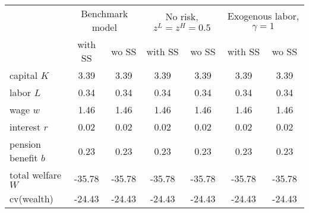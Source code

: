 
\begin{table}\centering
\begin{tabular}{lcccccc}
\toprule
	& \multicolumn{2}{c}{Benchmark model} & \multicolumn{2}{c}{No risk, $z^L = z^H = 0.5$} & \multicolumn{2}{c}{Exogenous labor, $\gamma = 1$} \\ 
	\cmidrule(lr){2-3}\cmidrule(lr){4-5}\cmidrule(lr){6-7}
	& with SS & wo SS & with SS & wo SS & with SS & wo SS\\
\midrule
	capital $K$ & 3.39 & 3.39 & 3.39 & 3.39 & 3.39 & 3.39\\
	labor $L$ & 0.34 & 0.34 & 0.34 & 0.34 & 0.34 & 0.34\\
	wage $w$ & 1.46 & 1.46 & 1.46 & 1.46 & 1.46 & 1.46\\
	interest $r$ & 0.02 & 0.02 & 0.02 & 0.02 & 0.02 & 0.02\\
	pension benefit $b$ & 0.23 & 0.23 & 0.23 & 0.23 & 0.23 & 0.23\\
	total welfare $W$ & -35.78 & -35.78 & -35.78 & -35.78 & -35.78 & -35.78\\
	cv(wealth) & -24.43 & -24.43 & -24.43 & -24.43 & -24.43 & -24.43\\

\bottomrule
\end{tabular}
\end{table}